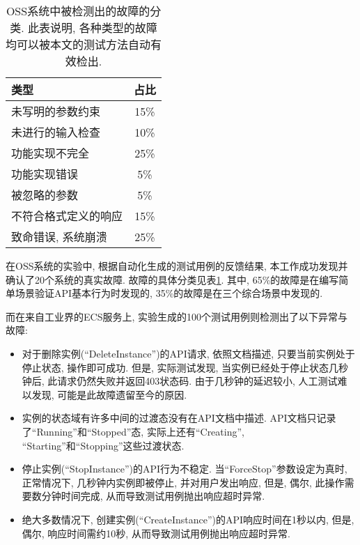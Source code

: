             \begin{table}[!htb]
                \centering
                \begin{tabular}{lc}
                    \toprule
                    类型 & 占比 \\
                    \midrule
                    未写明的参数约束 & 15\% \\
                    未进行的输入检查 & 10\% \\
                    功能实现不完全 & 25\% \\
                    功能实现错误 & 5\% \\
                    被忽略的参数 & 5\% \\
                    不符合格式定义的响应 & 15\% \\
                    致命错误, 系统崩溃 & 25\% \\
                    \bottomrule
                \end{tabular}
                \caption{OSS系统中被检测出的故障的分类. 此表说明, 各种类型的故障均可以被本文的测试方法自动有效检出.}
                \label{tab:oss_bug_classification}
            \end{table}
            
            在OSS系统的实验中, 根据自动化生成的测试用例的反馈结果, 本工作成功发现并确认了20个系统的真实故障. 故障的具体分类见表\ref{tab:oss_bug_classification}. 其中, 65\%的故障是在编写简单场景验证API基本行为时发现的, 35\%的故障是在三个综合场景中发现的.
            
            而在来自工业界的ECS服务上, 实验生成的100个测试用例则检测出了以下异常与故障:
            \begin{itemize}
                \item 对于删除实例(“DeleteInstance”)的API请求, 依照文档描述, 只要当前实例处于停止状态, 操作即可成功. 但是, 实际测试发现, 当实例已经处于停止状态几秒钟后, 此请求仍然失败并返回403状态码. 由于几秒钟的延迟较小, 人工测试难以发现, 可能是此故障遗留至今的原因.
                
                \item 实例的状态域有许多中间的过渡态没有在API文档中描述. API文档只记录了“Running”和“Stopped”态, 实际上还有“Creating”, “Starting”和“Stopping”这些过渡状态.
                
                \item 停止实例(“StopInstance”)的API行为不稳定. 当“ForceStop”参数设定为真时, 正常情况下, 几秒钟内实例即被停止, 并对用户发出响应, 但是, 偶尔, 此操作需要数分钟时间完成, 从而导致测试用例抛出响应超时异常.
                
                \item 绝大多数情况下, 创建实例(“CreateInstance”)的API响应时间在1秒以内, 但是, 偶尔, 响应时间需约10秒, 从而导致测试用例抛出响应超时异常.
            \end{itemize}
            
